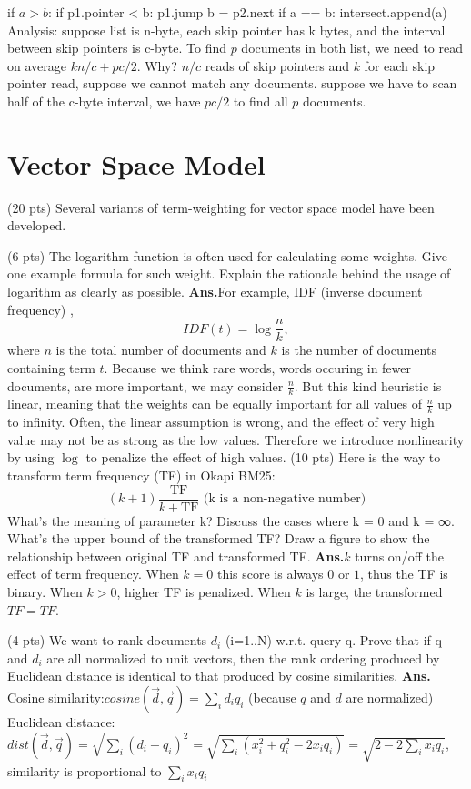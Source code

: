 \documentclass[11pt]{exam}
\newcommand{\ans}{\textbf{Ans.}}
\begin{document}
\begin{questions}
\begin{subparts}
 if $a > b$:
    if p1.pointer < b: p1.jump
    b = p2.next
 if a == b: intersect.append(a)\\
 Analysis: suppose list is n-byte, each skip pointer has k bytes, and the 
 interval between skip pointers is c-byte. To find $p$ documents in both list, 
 we need to read on average $kn/c+pc/2$. Why?  $n/c$ reads of skip pointers and $k$ 
 for each skip pointer read, suppose we cannot match any documents. suppose we 
 have to scan half of the c-byte interval, we have $pc/2$  to find all $p$ 
 documents.
 
    
  \end{subparts}
\end{questions}
\section{Vector Space Model}
\begin{questions}
  \question (20 pts) Several variants of term-weighting for vector space model have been developed.
  \begin{subparts}
    \subpart (6 pts) The logarithm function is often used for calculating some weights. Give one
example formula for such weight. Explain the rationale behind the usage of
logarithm as clearly as possible. 
\ans For example, IDF (inverse document frequency) 
, $$
IDF(t)=\log\frac{n}{k},
$$
where $n$ is the total number of documents and $k$ is the number of documents 
containing term $t$. Because we think rare words, words occuring in fewer 
documents, are more important, we may consider $\frac{n}{k}$. But this kind 
heuristic is linear, meaning that the weights can be equally important for all 
values of $\frac{n}{k}$ up to infinity. Often, the linear assumption is wrong, 
and the effect of very high value may not be as strong as the low values. 
Therefore we introduce nonlinearity by using $\log$ to penalize the effect of high values.
   \subpart  (10 pts) Here is the way to transform term frequency (TF) in Okapi BM25:
$$
(k+1)\frac{\mbox{TF}}{k+\mbox{TF}}\mbox{ (k is a non-negative number)
}
$$
  What’s the meaning of parameter k? Discuss the cases where k = 0 and k = ∞. What’s the upper bound of the transformed TF?
Draw a figure to show the relationship between original TF and transformed TF.
 \ans  $k$ turns on/off the effect of term frequency.  When $k=0$ this score is 
 always $0$ or $1$, thus the TF is binary. When $k>0$, higher TF is penalized. 
 When $k$ is large, the transformed $TF=TF$.
 
  \subpart (4 pts) We want to rank documents $d_i$ (i=1..N) w.r.t. query q. Prove that if q and $d_i$ are all normalized to unit vectors, then the rank ordering produced by Euclidean distance is identical to that produced by cosine similarities.
  \ans \\
  Cosine similarity:$cosine(\vec{d},\vec{q})=\sum_i d_i q_i$ (because $q$ and $d$ are normalized)\\
  Euclidean distance: $dist(\vec{d}, \vec{q})=\sqrt{\sum_i (d_i- q_i)^2}=\sqrt{\sum_i(x_i^2+q_i^2-2x_i q_i)}=\sqrt{2-2\sum_i x_i 
  q_i}$, similarity is proportional to $\sum_i x_i q_i$
  \end{subparts}
\end{questions}
\end{document}
